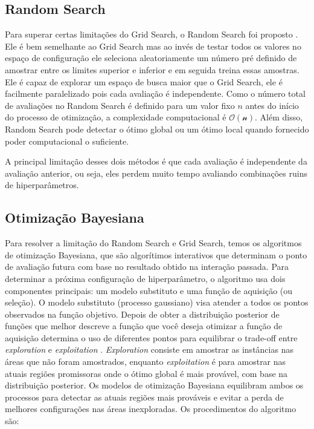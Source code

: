 \subsection{Random Search}
Para superar certas limitações do Grid Search, o Random Search foi
proposto \cite{randoms,grid:book,grid:random:2}. Ele é bem semelhante ao Grid Search mas ao invés de testar todos os valores no espaço de configuração ele seleciona aleatoriamente um número pré definido de amostrar entre os limites superior e inferior e em seguida treina essas amostras. Ele é capaz de explorar um espaço de busca maior que o Grid Search, ele é facilmente paralelizado pois cada avaliação é independente. Como o número total de avaliações no Random Search é
definido para um valor fixo $n$ antes do início do processo de otimização, a complexidade computacional  é $\mathcal{O(n)}$. Além disso, Random Search pode detectar o ótimo global ou um ótimo local quando fornecido poder computacional o suficiente.

A principal limitação desses dois métodos é que cada avaliação é independente da avaliação anterior, ou seja, eles perdem muito tempo avaliando combinações ruins de hiperparâmetros.


\subsection{Otimização Bayesiana}
Para resolver a limitação do Random Search e Grid Search, temos os algoritmos de otimização Bayesiana, que são algorítimos interativos que determinam o ponto de avaliação futura com base no resultado obtido na interação passada. Para determinar a próxima configuração de hiperparâmetro, o algoritmo usa dois componentes principais: um modelo substituto e uma função de aquisição (ou seleção).
O modelo substituto (processo gaussiano) visa atender a todos os pontos observados na função objetivo. Depois de obter a distribuição posterior de funções que melhor descreve a função que você deseja otimizar a função de aquisição determina o uso de diferentes pontos para equilibrar o trade-off entre \textit{exploration} e \textit{exploitation} \cite{grid:book,opt:bay}.
\textit{Exploration} consiste em amostrar as instâncias nas áreas que não
foram amostrados, enquanto \textit{exploitation} é para amostrar nas atuais regiões promissoras onde o ótimo global é mais provável, com base na distribuição posterior. Os modelos de otimização Bayesiana equilibram ambos os processos para detectar as atuais regiões mais prováveis e evitar a perda de melhores configurações nas áreas inexploradas.
Os procedimentos do algoritmo são:


